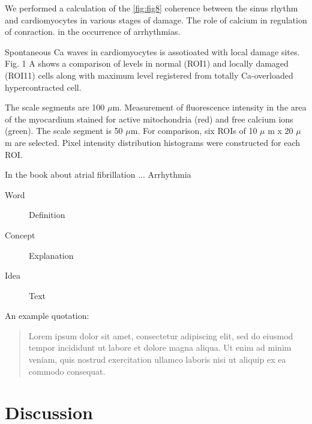 \documentclass{biophys-new}
\begin{document}
We performed a calculation of the \ref{fig:fig8} coherence between the sinus rhythm and cardiomyocytes in various stages of damage.
The role of calcium in regulation of conraction.
in the occurrence of arrhythmias.


Spontaneous Ca waves in cardiomyocytes is assotioated with local damage sites.
Fig. 1 A shows a comparison of  levels in normal (ROI1) and locally damaged (ROI11) cells along with maximum  level registered from totally Ca-overloaded hypercontracted cell.


The scale segments are 100 $\mu$m.
Measurement of fluorescence intensity in the area of the myocardium stained for active mitochondria (red) and free calcium ions (green).
The scale segment is 50 $\mu$m.
For comparison, six ROIs of 10 $\mu$ m x 20 $\mu$ m are selected.
Pixel intensity distribution histograms were constructed for each ROI.


In the book \cite{kockskamper2002subcellular} about atrial fibrillation ...
Arrhythmia





\begin{description}
\item[Word] Definition
\item[Concept] Explanation
\item[Idea] Text
\end{description}

An example quotation:

\begin{quote}
Lorem ipsum dolor sit amet, consectetur adipiscing elit, sed do eiusmod tempor incididunt ut labore et dolore magna aliqua. Ut enim ad minim veniam, quis nostrud exercitation ullamco laboris nisi ut aliquip ex ea commodo consequat.
\end{quote}


\section*{Discussion}
\end{document}
